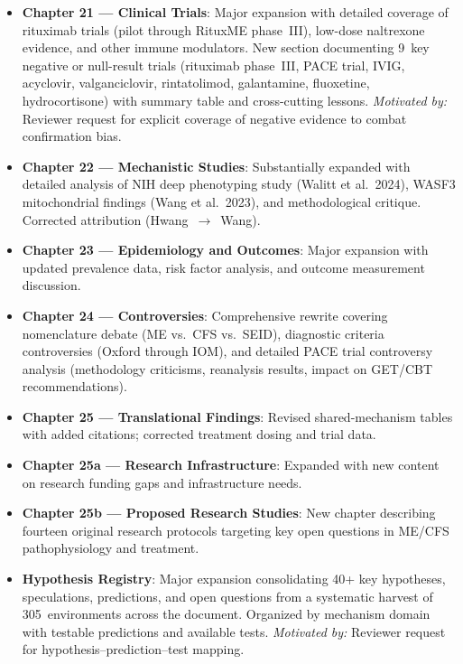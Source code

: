 \begin{itemize}

  \item \textbf{Chapter 21 --- Clinical Trials}: Major expansion with detailed
    coverage of rituximab trials (pilot through RituxME phase~III), low-dose
    naltrexone evidence, and other immune modulators. New section documenting
    9~key negative or null-result trials (rituximab phase~III, PACE trial, IVIG,
    acyclovir, valganciclovir, rintatolimod, galantamine, fluoxetine,
    hydrocortisone) with summary table and cross-cutting lessons.
    \textit{Motivated by:} Reviewer request for explicit coverage of negative
    evidence to combat confirmation bias.

  \item \textbf{Chapter 22 --- Mechanistic Studies}: Substantially expanded with
    detailed analysis of NIH deep phenotyping study (Walitt et al.\ 2024),
    WASF3 mitochondrial findings (Wang et al.\ 2023), and methodological
    critique. Corrected attribution (Hwang~$\to$~Wang).

  \item \textbf{Chapter 23 --- Epidemiology and Outcomes}: Major expansion
    with updated prevalence data, risk factor analysis, and outcome
    measurement discussion.

  \item \textbf{Chapter 24 --- Controversies}: Comprehensive rewrite covering
    nomenclature debate (ME vs.\ CFS vs.\ SEID), diagnostic criteria
    controversies (Oxford through IOM), and detailed PACE trial controversy
    analysis (methodology criticisms, reanalysis results, impact on GET/CBT
    recommendations).

  \item \textbf{Chapter 25 --- Translational Findings}: Revised shared-mechanism
    tables with added citations; corrected treatment dosing and trial data.

  \item \textbf{Chapter 25a --- Research Infrastructure}: Expanded with new
    content on research funding gaps and infrastructure needs.

  \item \textbf{Chapter 25b --- Proposed Research Studies}: New chapter describing
    fourteen original research protocols targeting key open questions in ME/CFS
    pathophysiology and treatment.

  \item \textbf{Hypothesis Registry}: Major expansion consolidating 40+ key
    hypotheses, speculations, predictions, and open questions from a systematic
    harvest of 305~environments across the document. Organized by mechanism
    domain with testable predictions and available tests.
    \textit{Motivated by:} Reviewer request for hypothesis--prediction--test mapping.

\end{itemize}

